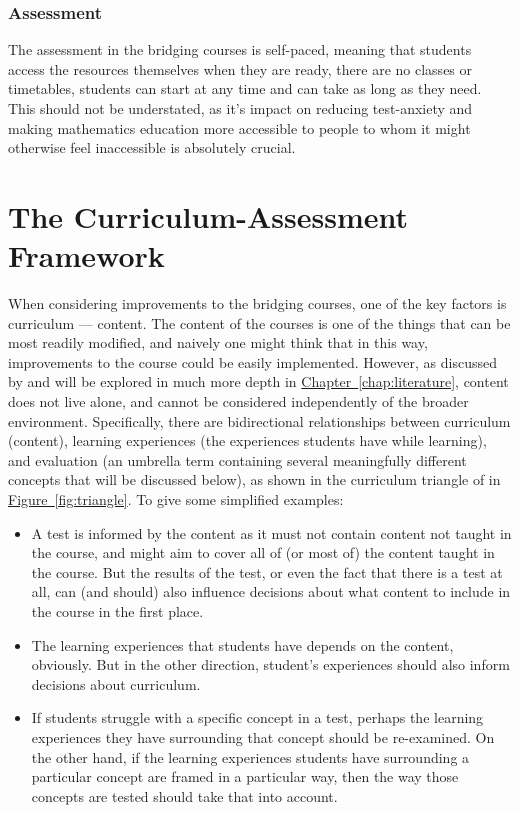 \documentclass[twoside,12pt,a4paper]{report}
\newcommand{\refchap}[1]{\hyperref[chap:#1]{Chapter~\ref{chap:#1}}}
\newcommand{\reffig}[1]{\hyperref[fig:#1]{Figure~\ref{fig:#1}}}
\begin{document}
\subsubsection{Assessment}

The assessment in the bridging courses is self-paced, meaning that students access the resources themselves when they are ready, there are no classes or timetables, students can start at any time and can take as long as they need. This should not be understated, as it's impact on reducing test-anxiety and making mathematics education more accessible to people to whom it might otherwise feel inaccessible is absolutely crucial.



\section{The Curriculum-Assessment Framework}
\label{sec:framework}

When considering improvements to the bridging courses, one of the key factors is curriculum --- content. The content of the courses is one of the things that can be most readily modified, and naively one might think that in this way, improvements to the course could be easily implemented. However, as discussed by \cite{Mohandas2003} and will be explored in much more depth in \refchap{literature}, content does not live alone, and cannot be considered independently of the broader environment. Specifically, there are bidirectional relationships between curriculum (content), learning experiences (the experiences students have while learning), and evaluation (an umbrella term containing several meaningfully different concepts that will be discussed below), as shown in the curriculum triangle of  in \reffig{triangle}. To give some simplified examples: 
\begin{itemize}
	\item A test is informed by the content as it must not contain content not taught in the course, and might aim to cover all of (or most of) the content taught in the course. But the results of the test, or even the fact that there is a test at all, can (and should) also influence decisions about what content to include in the course in the first place.
	\item The learning experiences that students have depends on the content, obviously. But in the other direction, student's experiences should also inform decisions about curriculum. 
	\item If students struggle with a specific concept in a test, perhaps the learning experiences they have surrounding that concept should be re-examined. On the other hand, if the learning experiences students have surrounding a particular concept are framed in a particular way, then the way those concepts are tested should take that into account.
\end{itemize}
\end{document}
